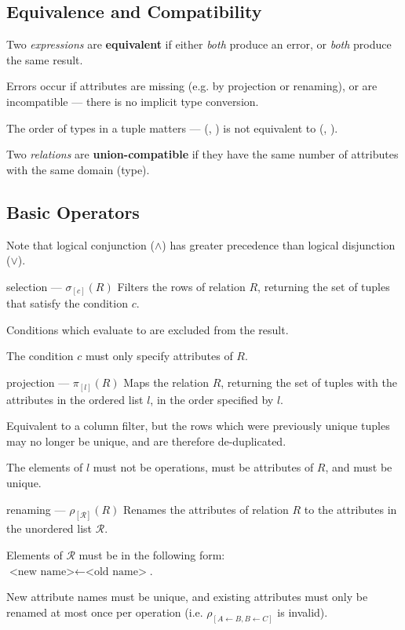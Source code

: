 \subsection{Equivalence and Compatibility}
Two \textit{expressions} are \textbf{equivalent} if either \textit{both} produce an error, or \textit{both} produce the same result.

Errors occur if attributes are missing (e.g. by projection or renaming), or
are incompatible --- there is no implicit type conversion.

The order of types in a tuple matters --- (, ) is not equivalent to (, ).

Two \textit{relations} are \textbf{union-compatible} if they have the same number of attributes with the same domain (type).

\subsection{Basic Operators}
Note that logical conjunction ($\land$) has greater precedence than logical disjunction ($\lor$).

\begin{defn}{selection --- $\sigma_{[c]}(R)$}
    Filters the rows of relation $R$, returning the set of tuples that satisfy the condition $c$.

    Conditions which evaluate to  are excluded from the result.

    The condition $c$ must only specify attributes of $R$.
\end{defn}

\begin{defn}{projection --- $\pi_{[l]}(R)$}
    Maps the relation $R$, returning the set of tuples with the attributes in the ordered list $l$, in the order specified by $l$.

    Equivalent to a column filter, but the rows which were previously unique tuples may no longer be unique, and are therefore de-duplicated.

    The elements of $l$ must not be operations, must be attributes of $R$, and must be unique.
\end{defn}

\begin{defn}{renaming --- $\rho_{[\mathcal{R} ]}(R)$}
    Renames the attributes of relation $R$ to the attributes in the unordered list $\mathcal{R}$.

    Elements of $\mathcal{R}$ must be in the following form: \\
    $\text{<new name>} \leftarrow \text{<old name>}$.

    New attribute names must be unique, and existing attributes must only be renamed at most once per operation (i.e. $\rho_{[A \leftarrow B, B \leftarrow C]}$ is invalid).
\end{defn}

